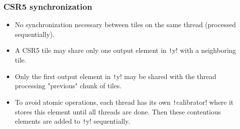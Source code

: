 \documentclass{beamer}
\newcommand{\csre}[1]{\texttt!#1!}
\begin{document}
\begin{frame}
    \frametitle{CSR5 synchronization}

    \begin{itemize}
        \item No synchronization necessary between tiles on the same thread (processed sequentially).
        \item A CSR5 tile may share only one output element in \csre{y} with a neighboring tile.
        \item Only the first output element in \csre{y} may be shared with the thread processing "previous" chunk of tiles.
        \item To avoid atomic operations, each thread has its own \csre{calibrator} where it stores this element until all threads are
              done. Then these contentious elements are added to \csre{y} sequentially.
    \end{itemize}
\end{frame}




\end{document}
